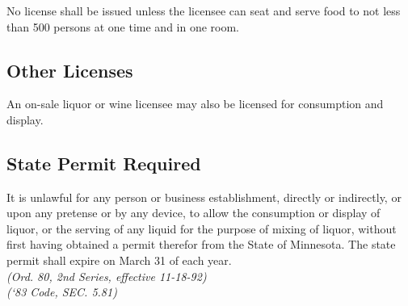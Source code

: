 \subsubsection{}
No license shall be issued unless the licensee can seat and serve food to not less than 500 persons at one time and in one room.
\subsection{Other Licenses}
An on-sale liquor or wine licensee may also be licensed for consumption and display.
\subsection{State Permit Required}
It is unlawful for any person or business establishment, directly or indirectly, or upon any pretense or by any device, to allow the consumption or display of liquor, or the serving of any liquid for the purpose of mixing of liquor, without first having obtained a permit therefor from the State of Minnesota.  The state permit shall expire on March 31 of each year.\\
\emph{(Ord. 80, 2nd Series, effective 11-18-92)}\\
\emph{(‘83 Code, SEC. 5.81)}

